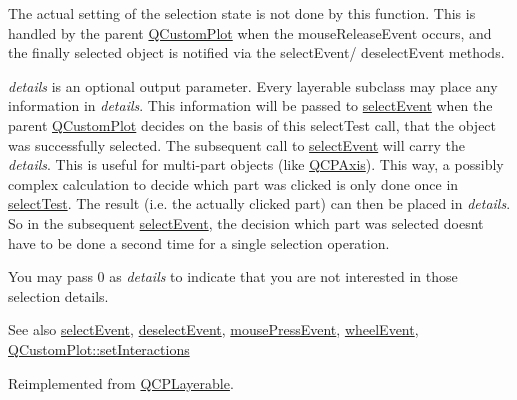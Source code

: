The actual setting of the selection state is not done by this function. This is handled by the parent \mbox{\hyperlink{class_q_custom_plot}{Q\+Custom\+Plot}} when the mouse\+Release\+Event occurs, and the finally selected object is notified via the select\+Event/ deselect\+Event methods.

{\itshape details} is an optional output parameter. Every layerable subclass may place any information in {\itshape details}. This information will be passed to \mbox{\hyperlink{class_q_c_p_abstract_item_aa4b969c58797f39c9c0b6c07c7869d17}{select\+Event}} when the parent \mbox{\hyperlink{class_q_custom_plot}{Q\+Custom\+Plot}} decides on the basis of this select\+Test call, that the object was successfully selected. The subsequent call to \mbox{\hyperlink{class_q_c_p_abstract_item_aa4b969c58797f39c9c0b6c07c7869d17}{select\+Event}} will carry the {\itshape details}. This is useful for multi-\/part objects (like \mbox{\hyperlink{class_q_c_p_axis}{Q\+C\+P\+Axis}}). This way, a possibly complex calculation to decide which part was clicked is only done once in \mbox{\hyperlink{class_q_c_p_abstract_item_ae41d0349d68bb802c49104afd100ba2a}{select\+Test}}. The result (i.\+e. the actually clicked part) can then be placed in {\itshape details}. So in the subsequent \mbox{\hyperlink{class_q_c_p_abstract_item_aa4b969c58797f39c9c0b6c07c7869d17}{select\+Event}}, the decision which part was selected doesn\textquotesingle{}t have to be done a second time for a single selection operation.

You may pass 0 as {\itshape details} to indicate that you are not interested in those selection details.

\begin{DoxySeeAlso}{See also}
\mbox{\hyperlink{class_q_c_p_abstract_item_aa4b969c58797f39c9c0b6c07c7869d17}{select\+Event}}, \mbox{\hyperlink{class_q_c_p_abstract_item_af9093798cb07a861dcc73f93ca16c0c1}{deselect\+Event}}, \mbox{\hyperlink{class_q_c_p_layerable_af6567604818db90f4fd52822f8bc8376}{mouse\+Press\+Event}}, \mbox{\hyperlink{class_q_c_p_layerable_a47dfd7b8fd99c08ca54e09c362b6f022}{wheel\+Event}}, \mbox{\hyperlink{class_q_custom_plot_a5ee1e2f6ae27419deca53e75907c27e5}{Q\+Custom\+Plot\+::set\+Interactions}} 
\end{DoxySeeAlso}


Reimplemented from \mbox{\hyperlink{class_q_c_p_layerable_a04db8351fefd44cfdb77958e75c6288e}{Q\+C\+P\+Layerable}}.



